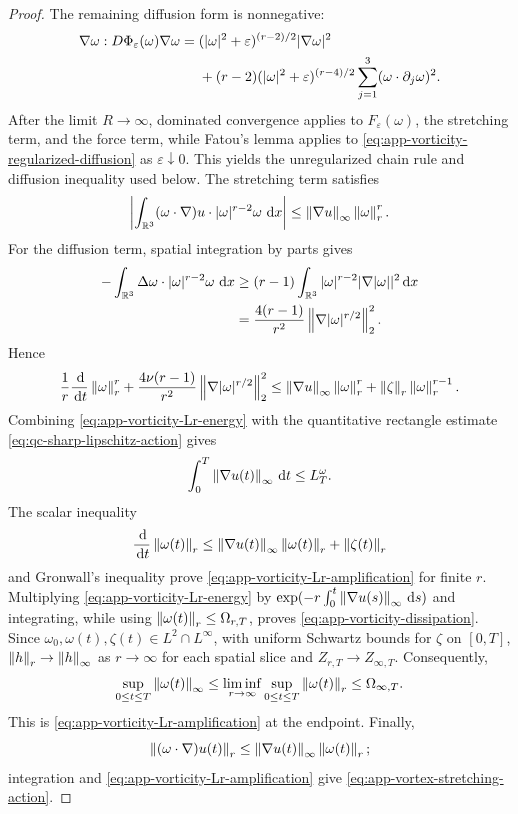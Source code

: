 \begin{proof}
The remaining diffusion form is nonnegative:
\begin{align}
 \nabla\omega:D\Phi_\varepsilon(\omega)\nabla\omega
 ={}&(|\omega|^2+\varepsilon)^{(r-2)/2}|\nabla\omega|^2
 \notag\\
 &+(r-2)(|\omega|^2+\varepsilon)^{(r-4)/2}
 \sum_{j=1}^3(\omega\cdot\partial_j\omega)^2.
 \label{eq:app-vorticity-regularized-diffusion}
\end{align}
After the limit \(R\to\infty\), dominated convergence applies to
\(F_\varepsilon(\omega)\), the stretching term, and the force term, while Fatou's lemma
applies to \eqref{eq:app-vorticity-regularized-diffusion} as
\(\varepsilon\downarrow0\).  This yields the unregularized chain rule and
diffusion inequality used below.  The stretching term
satisfies
\[
 \left|\int_{\mathbb R^3}(\omega\cdot\nabla)u\cdot
       |\omega|^{r-2}\omega\,\,\mathrm d x\right|
 \le\left\lVert \nabla u\right\rVert_\infty\left\lVert \omega\right\rVert_r^r.
\]
For the diffusion term, spatial integration by parts gives
\begin{align*}
 -\int_{\mathbb R^3}\Delta\omega\cdot|\omega|^{r-2}\omega\,\,\mathrm d x
 &\ge(r-1)\int_{\mathbb R^3}|\omega|^{r-2}|\nabla|\omega||^2\,\mathrm d x\\
 &=\frac{4(r-1)}{r^2}
   \left\lVert \nabla|\omega|^{r/2}\right\rVert_2^2.
\end{align*}
Hence
\begin{equation}
 \frac1r\frac{\,\mathrm d}{\,\mathrm d t}\left\lVert \omega\right\rVert_r^r
 +\frac{4\nu(r-1)}{r^2}
   \left\lVert \nabla|\omega|^{r/2}\right\rVert_2^2
 \le\left\lVert \nabla u\right\rVert_\infty\left\lVert \omega\right\rVert_r^r
 +\left\lVert \zeta\right\rVert_r\left\lVert \omega\right\rVert_r^{r-1}.
 \label{eq:app-vorticity-Lr-energy}
\end{equation}
Combining \eqref{eq:app-vorticity-Lr-energy} with the quantitative rectangle
estimate \eqref{eq:qc-sharp-lipschitz-action} gives
\[
 \int_0^T\left\lVert \nabla u(t)\right\rVert_\infty\,\mathrm d t\le L_T^\omega.
\]
The scalar inequality
\[
 \frac{\,\mathrm d}{\,\mathrm d t}\left\lVert \omega(t)\right\rVert_r
 \le\left\lVert \nabla u(t)\right\rVert_\infty\left\lVert \omega(t)\right\rVert_r+\left\lVert \zeta(t)\right\rVert_r
\]
and Gronwall's inequality prove
\eqref{eq:app-vorticity-Lr-amplification} for finite \(r\).  Multiplying
\eqref{eq:app-vorticity-Lr-energy} by
\(
 \exp(-r\int_0^t\left\lVert \nabla u(s)\right\rVert_\infty\,\mathrm d s)
\)
and integrating, while using
\(\left\lVert \omega(t)\right\rVert_r\le\Omega_{r,T}\), proves
\eqref{eq:app-vorticity-dissipation}.  Since
\(\omega_0,\omega(t),\zeta(t)\in L^2\cap L^\infty\), with uniform
Schwartz bounds for \(\zeta\) on \([0,T]\),
\(\left\lVert h\right\rVert_r\to\left\lVert h\right\rVert_\infty\) as \(r\to\infty\) for each spatial slice
and \(Z_{r,T}\to Z_{\infty,T}\).
Consequently,
\[
 \sup_{0\le t\le T}\left\lVert \omega(t)\right\rVert_\infty
 \le\liminf_{r\to\infty}
      \sup_{0\le t\le T}\left\lVert \omega(t)\right\rVert_r
 \le\Omega_{\infty,T}.
\]
This is \eqref{eq:app-vorticity-Lr-amplification} at the endpoint.  Finally,
\[
 \left\lVert (\omega\cdot\nabla)u(t)\right\rVert_r
 \le\left\lVert \nabla u(t)\right\rVert_\infty\left\lVert \omega(t)\right\rVert_r;
\]
integration and \eqref{eq:app-vorticity-Lr-amplification} give
\eqref{eq:app-vortex-stretching-action}.
\end{proof}

